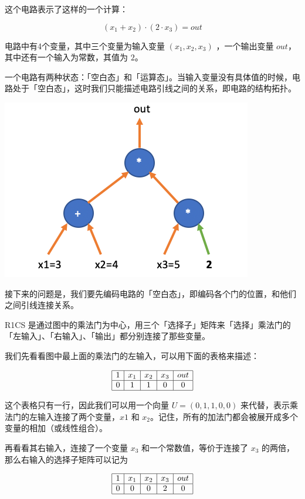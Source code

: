 这个电路表示了这样的一个计算：

\[
(x_1 + x_2) \cdot (2\cdot x_3) = out
\]

电路中有4个变量，其中三个变量为输入变量 \((x_1, x_2, x_3)\)
，一个输出变量 \(out\)，其中还有一个输入为常数，其值为 \(2\)。

一个电路有两种状态：「空白态」和「运算态」。当输入变量没有具体值的时候，电路处于「空白态」，这时我们只能描述电路引线之间的关系，即电路的结构拓扑。

\includegraphics[scale=0.5]{img/img20230414162845.png}

接下来的问题是，我们要先编码电路的「空白态」，即编码各个门的位置，和他们之间引线连接关系。

R1CS
是通过图中的乘法门为中心，用三个「选择子」矩阵来「选择」乘法门的「左输入」、「右输入」、「输出」都分别连接了那些变量。

我们先看看图中最上面的乘法门的左输入，可以用下面的表格来描述：

\[
\begin{array}{|c|c|c|c|c|}
\hline
1 & x_1 & x_2 & x_3 & out \\
\hline
0 & 1 & 1 & 0 & 0 \\
\hline
\end{array}
\]

这个表格只有一行，因此我们可以用一个向量 \(U=(0,1,1,0,0)\)
来代替，表示乘法门的左输入连接了两个变量，\(x1\) 和
\(x_2\)。记住，所有的加法门都会被展开成多个变量的相加（或线性组合）。

再看看其右输入，连接了一个变量 \(x_3\) 和一个常数值，等价于连接了
\(x_3\) 的两倍，那么右输入的选择子矩阵可以记为

\[
\begin{array}{|c|c|c|c|c|}
\hline
1 & x_1 & x_2 & x_3 & out \\
\hline
0 & 0 & 0 & 2 & 0 \\
\hline
\end{array}
\]

